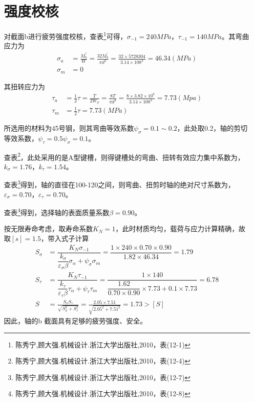 \section{强度校核}
	对截面b进行疲劳强度校核，查表\footnote{陈秀宁,顾大强.机械设计.浙江大学出版社,2010，表(12-1)}可得，$\sigma_{-1}=240MPa$，$\tau_{-1}=140MPa$。其弯曲应力为
	\begin{align}
		\sigma_a &=\frac{M^{″}_{b}}{W}=\frac{32M^{′}_{b}}{\pi d^3}=\frac{32\times 5728304}{3.14\times 108^3}=46.34(MPa)\\
		\sigma_m &=0
	\end{align}

	其扭转应力为
	\begin{align}
		\tau_a &=\frac{1}{2}\tau =\frac{T}{2W_T}=\frac{8T}{\pi d^3}=\frac{8\times 3.82\times 10^6}{3.14\times 108^3}=7.73(Mpa)\\
		\tau_m &=\frac{1}{2}\tau =7.73(MPa)
	\end{align}

	所选用的材料为45号钢，则其弯曲等效系数$\psi_{\sigma}=0.1\sim 0.2$，此处取0.2，轴的剪切等效系数，$\psi_{\tau} = 0.5\psi_{\sigma} = 0.1$。
	
	查表\footnote{陈秀宁,顾大强.机械设计.浙江大学出版社,2010，表(12-4)}，此处采用的是A型键槽，则得键槽处的弯曲、扭转有效应力集中系数为，$k_{\sigma}=1.76$，$k_{\tau}=1.54$。

	查表\footnote{陈秀宁,顾大强.机械设计.浙江大学出版社,2010，表(12-7)}得到，轴的直径在100-120之间，则弯曲、扭剪时轴的绝对尺寸系数为，$\varepsilon_{\sigma}=0.70$，$\varepsilon_{\tau}=0.70$。

	查表\footnote{陈秀宁,顾大强.机械设计.浙江大学出版社,2010，表(12-8)}得到，选择轴的表面质量系数$\beta = 0.90$。

	按无限寿命考虑，取寿命系数$K_N =1$，此时材质均匀，载荷与应力计算精确，故取$[s]=1.5$，带入式子计算
	\begin{align}
		S_{\sigma} &=\dfrac{K_N \sigma_{-1}}{\dfrac{k_{\sigma}}{\varepsilon_{\sigma}\beta}\sigma_{\alpha}+\psi_{\sigma}\sigma_m}=\dfrac{1\times 240\times 0.70\times 0.90}{1.82\times 46.34}=1.79\\
		S_{\tau} &=\dfrac{K_N \tau_{-1}}{\dfrac{k_{\tau}}{\varepsilon_{\tau}\beta}\tau_{\alpha}+\psi_{\tau}\tau_m}=\dfrac{1\times 140}{\dfrac{1.62}{0.70\times 0.90}\times 7.73+0.1\times 7.73}=6.78\\
		S &=\frac{S_{\sigma}S_{\tau}}{\sqrt{S^2_{\sigma}+S^2_{\tau}}}=\frac{2.05\times 7.51}{\sqrt{2.05^2+7.51^2}}=1.73>[S]
	\end{align}
	因此，轴的b 截面具有足够的疲劳强度、安全。

